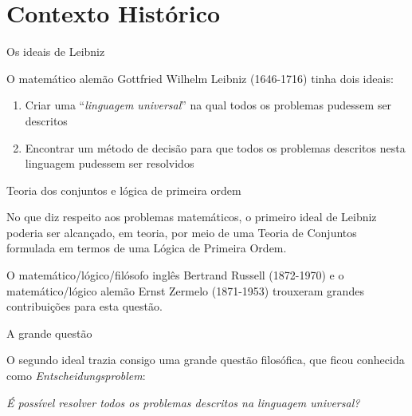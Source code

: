 \section{Contexto Histórico}

\begin{frame}[fragile]{Os ideais de Leibniz}

    O matemático alemão Gottfried Wilhelm Leibniz (1646-1716) tinha dois ideais:

    \vspace{0.2in}

    \begin{enumerate}
        \item Criar uma ``\textit{linguagem universal}'' na qual todos os problemas pudessem
            ser descritos
        \item Encontrar um método de decisão para que todos os problemas descritos nesta linguagem
            pudessem ser resolvidos
    \end{enumerate}

\end{frame}

\begin{frame}[fragile]{Teoria dos conjuntos e lógica de primeira ordem}

    No que diz respeito aos problemas matemáticos, o primeiro ideal de Leibniz poderia ser alcançado, em teoria, 
    por meio de uma Teoria de Conjuntos formulada em termos de uma Lógica de Primeira Ordem. 

    \vspace{0.2in}

    O matemático/lógico/filósofo inglês Bertrand Russell (1872-1970) e o matemático/lógico alemão
    Ernst Zermelo (1871-1953) trouxeram grandes contribuições para esta questão.

\end{frame}

\begin{frame}[fragile]{A grande questão}

    O segundo ideal trazia consigo uma grande questão filosófica, que ficou conhecida como
    \textit{Entscheidungsproblem}:

    \vspace{0.2in}
    \begin{center}
        {\it \Large É possível resolver todos os problemas descritos na linguagem universal?}
    \end{center}

\end{frame}

